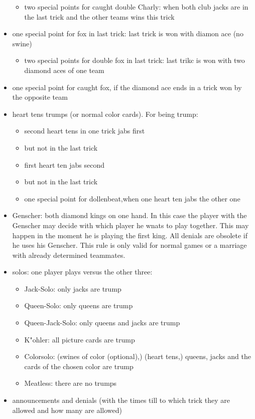 \documentclass[12pt,a4paper]{article}
\begin{document}
\begin{itemize}
\begin{itemize}
\item two special points for caught double Charly: when both club jacks are in the last trick and the other teams wins this trick
\end{itemize}
\item one special point for fox in last trick: last trick is won with diamon ace (no swine)
\begin{itemize}
\item two special points for double fox in last trick: last trikc is won with two diamond aces of one team
\end{itemize}
\item one special point for caught fox, if the diamond ace ends in a trick won by the opposite team
\item heart tens trumps (or normal color cards). For being trump:
\begin{itemize}
\item second heart tens in one trick jabs first
\item but not in the last trick
\item first heart ten jabs second
\item but not in the last trick
\item one special point for dollenbeat,when one heart ten jabs the other one
\end{itemize}
\item Genscher: both diamond kings on one hand. In this case the player with the Genscher may decide with which player
he wnats to play together. This may happen in the moment he is playing the first king.
All denials are obsolete if he uses his Genscher. This rule is only valid for normal games or a marriage with
already determined teammates.
\item solos: one player plays versus the other three:
\begin{itemize}
\item Jack-Solo: only jacks are trump
\item Queen-Solo: only queens are trump
\item Queen-Jack-Solo: only queens and jacks are trump
\item K"ohler: all picture cards are trump
\item Colorsolo: (swines of color (optional),) (heart tens,) queens, jacks and the cards of the chosen color are trump
\item Meatless: there are no trumps
\end{itemize}
\item announcements and denials (with the times till to which trick they are allowed and how many are allowed)

\end{itemize}
\end{document}
